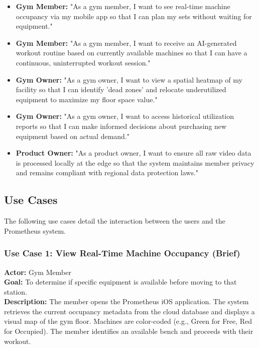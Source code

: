 \begin{itemize}
    \item \textbf{Gym Member:} "As a gym member, I want to see real-time machine occupancy via my mobile app so that I can plan my sets without waiting for equipment."
    \item \textbf{Gym Member:} "As a gym member, I want to receive an AI-generated workout routine based on currently available machines so that I can have a continuous, uninterrupted workout session."
    \item \textbf{Gym Owner:} "As a gym owner, I want to view a spatial heatmap of my facility so that I can identify 'dead zones' and relocate underutilized equipment to maximize my floor space value."
    \item \textbf{Gym Owner:} "As a gym owner, I want to access historical utilization reports so that I can make informed decisions about purchasing new equipment based on actual demand."
    \item \textbf{Product Owner:} "As a product owner, I want to ensure all raw video data is processed locally at the edge so that the system maintains member privacy and remains compliant with regional data protection laws."
\end{itemize}

\subsection{Use Cases}

The following use cases detail the interaction between the users and the Prometheus system.

\subsubsection{Use Case 1: View Real-Time Machine Occupancy (Brief)}
\textbf{Actor:} Gym Member \\
\textbf{Goal:} To determine if specific equipment is available before moving to that station. \\
\textbf{Description:} The member opens the Prometheus iOS application. The system retrieves the current occupancy metadata from the cloud database and displays a visual map of the gym floor. Machines are color-coded (e.g., Green for Free, Red for Occupied). The member identifies an available bench and proceeds with their workout.


